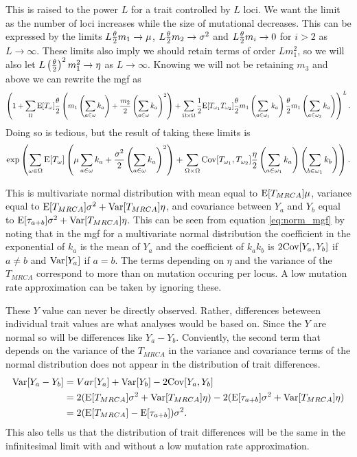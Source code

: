 This is raised to the power $L$ for a trait controlled by $L$ loci. We want the
limit as the number of loci increases while the size of mutational decreases.
This can be expressed by the limits $L \frac{\theta}{2} m_1 \to \mu$, $L \frac{\theta}{2} m_2\to \sigma^2$
and $L \frac{\theta}{2} m_i\to 0$ for $i>2$ as $L \to \infty$. These limits also imply we
should retain terms of order $L m_1^2$, so we will also let $L \left(\frac{\theta}{2}\right)^2
m_1^2 \to \eta$ as $L \to \infty$. Knowing we will not be retaining $m_3$ and
above we can rewrite the mgf as
\begin{equation*}
  \left(1 + \sum_{\Omega} \mathrm{E}[T_\omega] \frac{\theta}{2} \left(m_1 \left(\sum_{a \in \omega} k_a \right) +
  \frac{m_2}{2} \left(\sum_{a \in \omega} k_a \right)^2\right) +
  \sum_{\Omega \times \Omega} \frac{1}{2} \mathrm{E}[T_{\omega_1}T_{\omega_2}]
  \frac{\theta}{2} m_1 \left(\sum_{a \in \omega_1} k_a \right)
  \frac{\theta}{2} m_1 \left(\sum_{a \in \omega_2} k_a \right)\right)^L.
\end{equation*}
Doing so is tedious, but the result of taking these limits is
\begin{equation}
  \label{eq:norm_mgf}
  \exp \left( \sum_{\omega \in \Omega}\mathrm{E}[T_{\omega}] \left( \mu 
  \sum_{a \in \omega} k_a + \frac{\sigma^2}{2}\left( \sum_{a \in \omega}
  k_a\right)^2\right) +
\sum_{\Omega \times \Omega} \mathrm{Cov}[T_{\omega_1},T_{\omega_2}]\frac{\eta}{2}
\left(\sum_{a \in \omega_1} k_a\right) \left(\sum_{b \in \omega_1} k_b\right)\right).
\end{equation}

This is multivariate normal distribution with mean equal to $\mathrm{E}[T_{MRCA}]\mu$,
variance equal to $\mathrm{E}[T_{MRCA}]\sigma^2 + \mathrm{Var}[T_{MRCA}]\eta$, and covariance
between $Y_a$ and $Y_b$ equal to $\mathrm{E}[\tau_{a+b}]\sigma^2 + \mathrm{Var}[T_{MRCA}]\eta$.
This can be seen from equation \eqref{eq:norm_mgf} by noting that in the mgf for
a multivariate normal distribution the coefficient in the exponential of $k_a$
is the mean of $Y_a$ and the coefficient of $k_ak_b$ is $2\mathrm{Cov}[Y_a,Y_b]$ if
$a\neq b$ and $\mathrm{Var}[Y_a]$ if $a=b$. The terms depending on $\eta$ and the
variance of the $T_{MRCA}$ correspond to more than on mutation occuring per
locus. A low mutation rate approximation can be taken by ignoring these.

These $Y$ value can never be directly observed. Rather, differences beteween
individual trait values are what analyses would be based on. Since the $Y$ are
normal so will be differences like $Y_a-Y_b$. Conviently, the second term that
depends on the variance of the $T_{MRCA}$ in the variance and covariance terms
of the normal distribution does not appear in the distribution of trait
differences.
\begin{align*}
  \mathrm{Var}[Y_a-Y_b] &= Var[Y_a] + \mathrm{Var}[Y_b] - 2\mathrm{Cov}[Y_a,Y_b]\\
                &= 2(\mathrm{E}[T_{MRCA}]\sigma^2 + \mathrm{Var}[T_{MRCA}]\eta) -
                  2(\mathrm{E}[\tau_{a+b}]\sigma^2 + \mathrm{Var}[T_{MRCA}]\eta)\\
                &= 2(\mathrm{E}[T_{MRCA}] - \mathrm{E}[\tau_{a+b}])\sigma^2.
\end{align*}
This also tells us that the distribution of trait differences will be the same
in the infinitesimal limit with and without a low mutation rate approximation.

